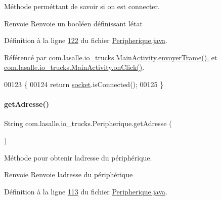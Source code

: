 Méthode perméttant de savoir si on est connecter. 

\begin{DoxyReturn}{Renvoie}
Renvoie un booléen définissant l\textquotesingle{}état 
\end{DoxyReturn}


Définition à la ligne \hyperlink{_peripherique_8java_source_l00122}{122} du fichier \hyperlink{_peripherique_8java_source}{Peripherique.\+java}.



Référencé par \hyperlink{_main_activity_8java_source_l00242}{com.\+lasalle.\+io\+\_\+trucks.\+Main\+Activity.\+envoyer\+Trame()}, et \hyperlink{_main_activity_8java_source_l00131}{com.\+lasalle.\+io\+\_\+trucks.\+Main\+Activity.\+on\+Click()}.


\begin{DoxyCode}
00123     \{
00124         \textcolor{keywordflow}{return} \hyperlink{classcom_1_1lasalle_1_1io__trucks_1_1_peripherique_ac5f2ba9eadd31a1f08f745e68476d238}{socket}.isConnected();
00125     \}
\end{DoxyCode}
\mbox{\label{classcom_1_1lasalle_1_1io__trucks_1_1_peripherique_a4c8533394dd5322a31b7d09d17bfc796}} 
\paragraph{\texorpdfstring{get\+Adresse()}{getAdresse()}}
{\footnotesize\ttfamily String com.\+lasalle.\+io\+\_\+trucks.\+Peripherique.\+get\+Adresse (\begin{DoxyParamCaption}{ }\end{DoxyParamCaption})}



Méthode pour obtenir l\textquotesingle{}adresse du périphérique. 

\begin{DoxyReturn}{Renvoie}
Renvoie l\textquotesingle{}adresse du périphérique 
\end{DoxyReturn}


Définition à la ligne \hyperlink{_peripherique_8java_source_l00113}{113} du fichier \hyperlink{_peripherique_8java_source}{Peripherique.\+java}.



